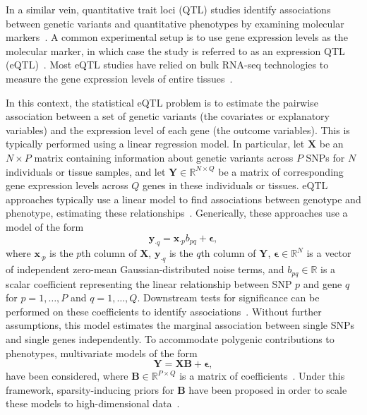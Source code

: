 \documentclass{bmcart}
\begin{document}
In a similar vein, quantitative trait loci (QTL) studies identify associations between genetic variants and quantitative phenotypes by examining molecular markers~\citep{zeng1994precision,doerge2002mapping}. A common experimental setup is to use gene expression levels as the molecular marker, in which case the study is referred to as an expression QTL (eQTL)~\citep{nica2013expression,kendziorski2006statistical}.
Most eQTL studies have relied on bulk RNA-seq technologies to measure the gene expression levels of entire tissues~\citep{pickrell2010understanding,aguet2017genetic, gtex2020gtex}. 

In this context, the statistical eQTL problem is to estimate the pairwise association between a set of genetic variants (the covariates or explanatory variables) and the expression level of each gene (the outcome variables). This is typically performed using a linear regression model. In particular, let $\mathbf{X}$ be an $N\times P$ matrix containing information about genetic variants across $P$ SNPs for $N$ individuals or tissue samples, and let $\mathbf{Y} \in \mathbb{R}^{N \times Q}$ be a matrix of corresponding gene expression levels across $Q$ genes in these individuals or tissues. eQTL approaches typically use a linear model to find associations between genotype and phenotype, estimating these relationships~\citep{GWASstatmethods}. Generically, these approaches use a model of the form
\begin{equation}
    \mathbf{y}_{\cdot q} = \mathbf{x}_{\cdot p} b_{pq} + \boldsymbol{\epsilon}, \label{eq:linearmodel}
\end{equation}
where $\mathbf{x}_{\cdot p}$ is the $p$th column of $\mathbf{X}$, $\mathbf{y}_{\cdot q}$ is the $q$th column of $\mathbf{Y}$, $\boldsymbol{\epsilon} \in \mathbb{R}^{N}$ is a vector of independent zero-mean Gaussian-distributed noise terms, and $b_{pq} \in \mathbb{R}$ is a scalar coefficient representing the linear relationship between SNP $p$ and gene $q$ for $p = 1, \dots, P$ and $q = 1,\dots, Q$.
Downstream tests for significance can be performed on these coefficients to identify associations~\citep{li2008methods,wu2011rare,lee2012optimal}.
Without further assumptions, this model estimates the marginal association between single SNPs and single genes independently. 
To accommodate polygenic contributions to phenotypes, multivariate models of the form 
\begin{equation}
    \mathbf{Y} = \mathbf{X} \mathbf{B} + \boldsymbol{\epsilon}, \label{eq:linearmodel_matrix_form}
\end{equation}
have been considered, where $\mathbf{B} \in \mathbb{R}^{P \times Q}$ is a matrix of coefficients~\citep{hoggart2008simultaneous,logsdon2010variational,wu2009genome}. Under this framework, sparsity-inducing priors for $\mathbf{B}$ have been proposed in order to scale these models to high-dimensional data~\citep{li2011bayesian,li2015bayesian}. 
\end{document}
